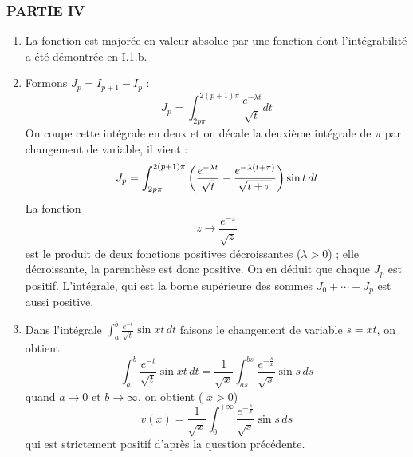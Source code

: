 \subsubsection*{PARTIE IV}

\begin{enumerate}
\item  La fonction est major{\'e}e en valeur absolue par une fonction dont
l'int{\'e}grabilit{\'e} a {\'e}t{\'e} d{\'e}montr{\'e}e en I.1.b.

\item  Formons $J_{p}=I_{p+1}-I_{p}$ :
\[
J_{p}=\int_{2p\pi }^{2(p+1)\pi }\frac{e^{-\lambda t}}{\sqrt{t}}dt
\]
On coupe cette int{\'e}grale en deux et on d{\'e}cale la deuxi{\`e}me
int{\'e}grale de $\pi $ par changement de variable, il vient :
\[
J_{p}=\int_{2p\pi }^{2(p+1)\pi }\left( \frac{e^{-\lambda t}}{\sqrt{t}}-\frac{%
e^{-\lambda (t+\pi )}}{\sqrt{t+\pi }}\right) \sin t\,dt
\]
La fonction
\[
z\rightarrow \frac{e^{-z}}{\sqrt{z}}
\]
est le produit de deux fonctions positives d{\'e}croissantes ($\lambda
>0$) ; elle d{\'e}croissante, la parenth{\`e}se est donc positive.\newline
On en d{\'e}duit que chaque $J_{p}$ est positif. L'int{\'e}grale, qui est
la borne sup{\'e}rieure des sommes $J_{0}+\cdots +J_{p}$ est aussi
positive.

\item  Dans l'int{\'e}grale $\int_{a}^{b}\frac{e^{-t}}{\sqrt{t}}\sin xt\,dt$
faisons le changement de variable $s=xt$, on obtient
\[
\int_{a}^{b}\frac{e^{-t}}{\sqrt{t}}\sin xt\,dt=\frac{1}{\sqrt{x}}%
\int_{as}^{bs}\frac{e^{-\frac{s}{x}}}{\sqrt{s}}\sin s\,ds
\]
quand $a\rightarrow 0$ et $b\rightarrow \infty $, on obtient (
$x>0$)
\[
v(x)=\frac{1}{\sqrt{x}}\int_{0}^{+\infty }\frac{e^{-\frac{s}{x}}}{\sqrt{s}}%
\sin s\,ds
\]
qui est strictement positif d'apr{\`e}s la question pr{\'e}c{\'e}dente.
\end{enumerate}
